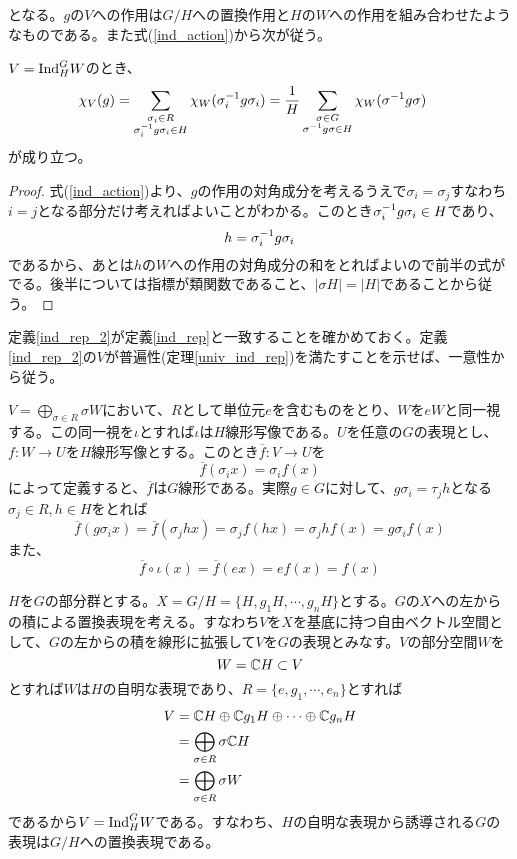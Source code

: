 \documentclass{ltjsreport}
\begin{document}
となる。$g$の$V$への作用は$G/H$への置換作用と$H$の$W$への作用を組み合わせたようなものである。また式(\ref{ind_action})から次が従う。

\begin{prop}[誘導表現の指標]\label{ind_char}
  $V=\text{Ind}_H^GW$のとき、
  \begin{align}
  \chi_V(g)&=\sum_{\substack{\sigma_i\in R \\ \sigma_i^{-1}g\sigma_i\in H}}\chi_W(\sigma_i^{-1}g\sigma_i)
  =\frac{1}{H}\sum_{\substack{\sigma\in G \\ \sigma^{-1}g\sigma\in H}}\chi_W(\sigma^{-1}g\sigma)
\end{align}
が成り立つ。
\end{prop}

\begin{proof}
  式(\ref{ind_action})より、$g$の作用の対角成分を考えるうえで$\sigma_i=\sigma_j$すなわち$i=j$となる部分だけ考えればよいことがわかる。このとき$\sigma_i^{-1}g\sigma_i\in H$であり、
  \[
  h=\sigma_i^{-1}g\sigma_i 
  \]
  であるから、あとは$h$の$W$への作用の対角成分の和をとればよいので前半の式がでる。後半については指標が類関数であること、$|\sigma H|=|H|$であることから従う。
\end{proof}

定義\ref{ind_rep_2}が定義\ref{ind_rep}と一致することを確かめておく。定義\ref{ind_rep_2}の$V$が普遍性(定理\ref{univ_ind_rep})を満たすことを示せば、一意性から従う。

$V=\bigoplus_{\sigma\in R}\sigma W$において、$R$として単位元$e$を含むものをとり、$W$を$eW$と同一視する。この同一視を$\iota$とすれば$\iota$は$H$線形写像である。$U$を任意の$G$の表現とし、$f:W\rightarrow U$を$H$線形写像とする。このとき$\overline{f}:V\rightarrow U$を
\[
\overline{f}(\sigma_i x)=\sigma_i f(x)
\]
によって定義すると、$\overline{f}$は$G$線形である。実際$g\in G$に対して、$g\sigma_i =\tau_j h$となる$\sigma_j\in R, h\in H$をとれば
\[
\overline{f}(g\sigma_i x)=\overline{f}(\sigma_j hx)=\sigma_jf(hx)=\sigma_jhf(x)=g\sigma_if(x)  
\]
また、
\[
\overline{f}\circ\iota(x)=\overline{f}(ex)=ef(x)=f(x)  
\]


\begin{eg}\label{ind_from_trivial}
  $H$を$G$の部分群とする。$X=G/H=\{H,g_1H,\cdots,g_nH\}$とする。$G$の$X$への左からの積による置換表現を考える。すなわち$V$を$X$を基底に持つ自由ベクトル空間として、$G$の左からの積を線形に拡張して$V$を$G$の表現とみなす。$V$の部分空間$W$を
  \[
  W=\mathbb{C} H\subset V  
  \]
  とすれば$W$は$H$の自明な表現であり、$R=\{e,g_1,\cdots,e_n\}$とすれば
  \begin{align*}
  V&=\mathbb{C} H\oplus \mathbb{C} g_1H\oplus\cdots\oplus\mathbb{C} g_nH\\
  &=\bigoplus_{\sigma\in R}\sigma\mathbb{C} H\\
  &=\bigoplus_{\sigma\in R}\sigma W
  \end{align*}
  であるから$V=\text{Ind}_H^GW$である。すなわち、$H$の自明な表現から誘導される$G$の表現は$G/H$への置換表現である。
\end{eg}
\end{document}

